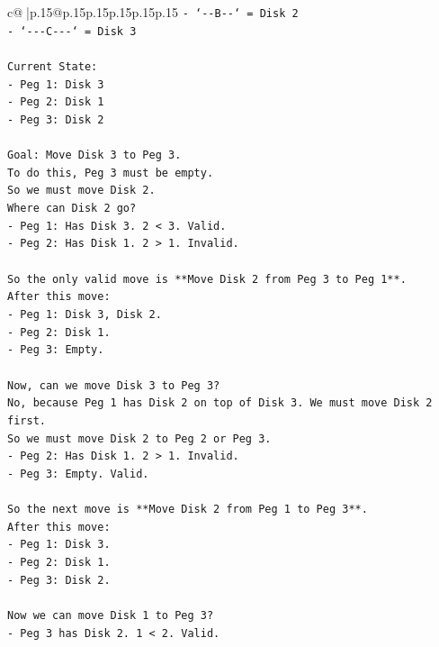 \documentclass{article}
\begin{document}
{\begin{supertabular}{c@{$\;$}|p{.15\linewidth}@{}p{.15\linewidth}p{.15\linewidth}p{.15\linewidth}p{.15\linewidth}p{.15\linewidth}}
{{{\texttt{{-} `{-}{-}B{-}{-}` = Disk 2} \\
\texttt{{-} `{-}{-}{-}C{-}{-}{-}` = Disk 3} \\
\\ 
\texttt{Current State:} \\
\texttt{{-} Peg 1: Disk 3} \\
\texttt{{-} Peg 2: Disk 1} \\
\texttt{{-} Peg 3: Disk 2} \\
\\ 
\texttt{Goal: Move Disk 3 to Peg 3.} \\
\texttt{To do this, Peg 3 must be empty.} \\
\texttt{So we must move Disk 2.} \\
\texttt{Where can Disk 2 go?} \\
\texttt{{-} Peg 1: Has Disk 3. 2 < 3. Valid.} \\
\texttt{{-} Peg 2: Has Disk 1. 2 > 1. Invalid.} \\
\\ 
\texttt{So the only valid move is **Move Disk 2 from Peg 3 to Peg 1**.} \\
\texttt{After this move:} \\
\texttt{{-} Peg 1: Disk 3, Disk 2.} \\
\texttt{{-} Peg 2: Disk 1.} \\
\texttt{{-} Peg 3: Empty.} \\
\\ 
\texttt{Now, can we move Disk 3 to Peg 3?} \\
\texttt{No, because Peg 1 has Disk 2 on top of Disk 3. We must move Disk 2 first.} \\
\texttt{So we must move Disk 2 to Peg 2 or Peg 3.} \\
\texttt{{-} Peg 2: Has Disk 1. 2 > 1. Invalid.} \\
\texttt{{-} Peg 3: Empty. Valid.} \\
\\ 
\texttt{So the next move is **Move Disk 2 from Peg 1 to Peg 3**.} \\
\texttt{After this move:} \\
\texttt{{-} Peg 1: Disk 3.} \\
\texttt{{-} Peg 2: Disk 1.} \\
\texttt{{-} Peg 3: Disk 2.} \\
\\ 
\texttt{Now we can move Disk 1 to Peg 3?} \\
\texttt{{-} Peg 3 has Disk 2. 1 < 2. Valid.} \\
}}}
\end{supertabular}}
\end{document}
